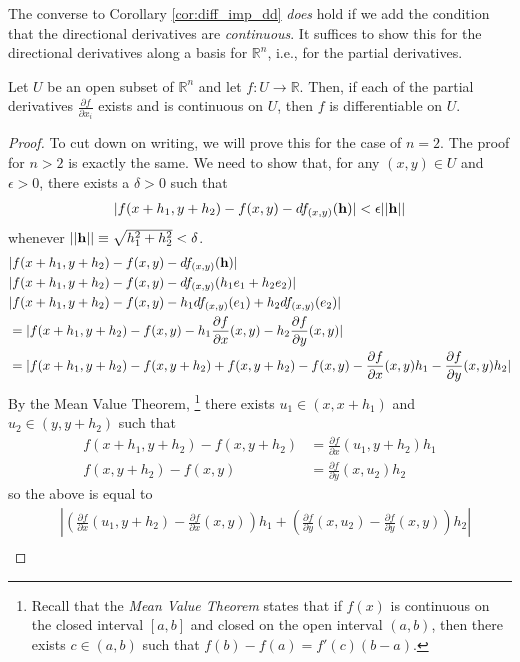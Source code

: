 \documentclass[12pt,letterpaper,reqno]{article}
\numberwithin{equation}{section}
\newcommand{\R}{\ensuremath{\mathbb R}}
\begin{document}
{The converse to Corollary \ref{cor:diff_imp_dd} \emph{does} hold if we add the condition that the directional derivatives are \emph{continuous}. It suffices to show this for the directional derivatives along a basis for $\R^n$, i.e., for the partial derivatives.

\begin{thm}
	Let $U$ be an open subset of $\mathbb{R}^n$ and let $f:U \to \mathbb{R}$. Then, if each of the partial derivatives $\frac{\partial f}{\partial x_i}$ exists and is continuous on $U$, then $f$ is differentiable on $U$.
\end{thm}

\begin{proof}
To cut down on writing, we will prove this for the case of $n=2$. The proof for $n>2$ is exactly the same. We need to show that, for any $(x,y) \in U$ and $\epsilon > 0$, there exists a $\delta > 0$ such that
\begin{align*}
	|f(x+h_1,y+h_2)-f(x,y)-df_{(x,y)}({\bf h})|<\epsilon||{\bf h}||
\end{align*}
whenever $||{\bf h}||\equiv \sqrt{h_1^2+h_2^2}< \delta$.  
\begin{align*}
	&|f(x+h_1,y+h_2)-f(x,y)-df_{(x,y)}({\bf h})|\\
	&|f(x+h_1,y+h_2)-f(x,y)-df_{(x,y)}(h_1e_1+h_2e_2)|\\
	&|f(x+h_1,y+h_2)-f(x,y)-h_1df_{(x,y)}(e_1)+h_2df_{(x,y)}(e_2)|\\
	&=|f(x+h_1,y+h_2)-f(x,y)-h_1\frac{\partial f}{\partial x}(x,y)-h_2\frac{\partial f}{\partial y}(x,y)| \\
	&=|f(x+h_1,y+h_2)-f(x,y+h_2)+f(x,y+h_2)-f(x,y)-\frac{\partial f}{\partial x}(x,y)h_1-\frac{\partial f}{\partial y}(x,y)h_2| \\
\end{align*}
By the Mean Value Theorem, \footnote{Recall that the \emph{Mean Value Theorem} states that if $f(x)$ is continuous on the closed interval $[a,b]$ and closed on the open interval $(a,b)$, then there exists $c \in (a,b)$ such that $f(b)-f(a)=f'(c)(b-a)$.} there exists $u_1 \in (x,x+h_1)$ and $u_2 \in (y,y+h_2)$ such that
\begin{align*}
	f(x+h_1,y+h_2)-f(x,y+h_2)&=\frac{\partial f}{\partial x}(u_1,y+h_2)h_1 \\
	f(x,y+h_2)-f(x,y)&=\frac{\partial f}{\partial y}(x,u_2)h_2
\end{align*}
so the above is equal to
\begin{align*}
	&|(\frac{\partial f}{\partial x}(u_1,y+h_2)-\frac{\partial f}{\partial x}(x,y))h_1+(\frac{\partial f}{\partial y}(x,u_2)-\frac{\partial f}{\partial y}(x,y))h_2|\\

\end{align*}
\end{proof}}
\end{document}
